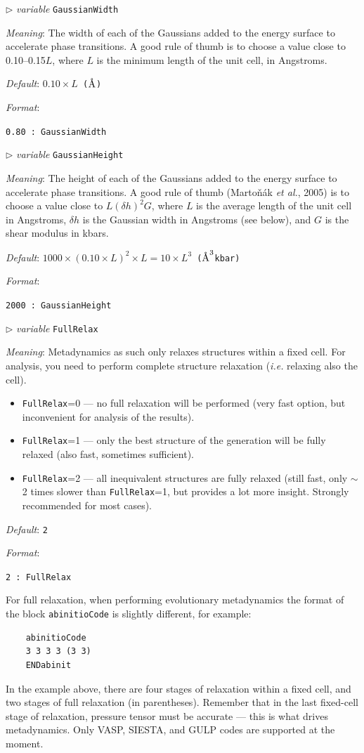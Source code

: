 \documentclass[12pt]{article}
\newcommand{\keyword}[1]{\texttt{#1}}
\newcommand{\paramacro}[6]{
\vspace{0.5cm}
$\triangleright$ \emph{variable} {\color{blue} \texttt{#1}}

\emph{Meaning}: {#2}

{#3}

\emph{Default}: \texttt{#4}

\emph{Format}:

{\addtolength{\leftskip}{10mm} 
\texttt{#5}
\par}


{\small #6}

}
\begin{document}
\paramacro{GaussianWidth}{The width of each of the Gaussians added to the energy
surface to accelerate phase transitions. A good rule of thumb is to choose a
value close to 0.10--0.15$L$, where $L$ is the minimum length of the unit cell,
in Angstroms.}{}{$0.10 \times L$ \rm ($\text{\r{A}}$)}{0.80  : GaussianWidth}{}

\paramacro{GaussianHeight}{The height of each of the Gaussians added to the
energy surface to accelerate phase transitions. A good rule of thumb
(Marto\v{n}\'{a}k \emph{et al.}, 2005) is to choose a value close to $L(\delta
h)^2 G$, where $L$ is the average length of the unit cell in Angstroms, $\delta
h$ is the Gaussian width in Angstroms (see below), and $G$ is the shear modulus
in kbars.}{}{$1000 \times (0.10 \times L)^2 \times L = 10 \times L^3$ \rm
($\text{\r{A}}^3$kbar)}{2000 : GaussianHeight}{}

\paramacro{FullRelax}{Metadynamics as such only relaxes structures within a
fixed cell. For analysis, you need to perform complete structure relaxation
(\emph{i.e.} relaxing also the cell).}{
\begin{itemize}
  \item \keyword{FullRelax}=0 --- no full relaxation will be performed
  (very fast option, but inconvenient for analysis of the results).
  
  \item \keyword{FullRelax}=1 --- only the best structure of the generation
  will be fully relaxed (also fast, sometimes sufficient).
  
  \item \keyword{FullRelax}=2 --- all inequivalent structures are fully relaxed
  (still fast, only $\sim$2 times slower than \keyword{FullRelax}=1, but
  provides a lot more insight. Strongly recommended for most cases).
\end{itemize}
}{2}{2 : FullRelax }{}

\vspace{0.5 cm}
For full relaxation, when performing evolutionary metadynamics the
format of the block \keyword{abinitioCode} is slightly different, for example:
\begin{verbatim}
    abinitioCode
    3 3 3 3 (3 3)
    ENDabinit
\end{verbatim}

In the example above, there are four stages of relaxation within a fixed cell,
and two stages of full relaxation (in parentheses). Remember that in the last
fixed-cell stage of relaxation, pressure tensor must be accurate --- this is
what drives metadynamics. Only VASP, SIESTA, and GULP codes are supported at the
moment.
\end{document}
